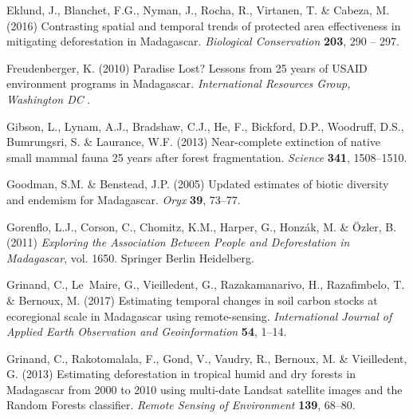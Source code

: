 \documentclass[a4paper, 12pt, leqno]{article} %
\begin{document}
\begin{thebibliography}{60}
Eklund, J., Blanchet, F.G., Nyman, J., Rocha, R., Virtanen, T. \& Cabeza, M.
  (2016) {Contrasting spatial and temporal trends of protected area
  effectiveness in mitigating deforestation in Madagascar}. \emph{Biological
  Conservation} \textbf{203}, 290 -- 297.

Freudenberger, K. (2010) {Paradise Lost? Lessons from 25 years of USAID
  environment programs in Madagascar}. \emph{International Resources Group,
  Washington DC} .

Gibson, L., Lynam, A.J., Bradshaw, C.J., He, F., Bickford, D.P., Woodruff,
  D.S., Bumrungsri, S. \& Laurance, W.F. (2013) Near-complete extinction of
  native small mammal fauna 25 years after forest fragmentation. \emph{Science}
  \textbf{341}, 1508--1510.

Goodman, S.M. \& Benstead, J.P. (2005) {Updated estimates of biotic diversity
  and endemism for Madagascar}. \emph{Oryx} \textbf{39}, 73--77.

Gorenflo, L.J., Corson, C., Chomitz, K.M., Harper, G., Honzák, M. \&
  {\"O}zler, B. (2011) \emph{{Exploring the Association Between People and
  Deforestation in Madagascar}}, vol. 1650. Springer Berlin Heidelberg.

Grinand, C., Le~Maire, G., Vieilledent, G., Razakamanarivo, H., Razafimbelo, T.
  \& Bernoux, M. (2017) {Estimating temporal changes in soil carbon stocks at
  ecoregional scale in Madagascar using remote-sensing}. \emph{International
  Journal of Applied Earth Observation and Geoinformation} \textbf{54}, 1--14.

Grinand, C., Rakotomalala, F., Gond, V., Vaudry, R., Bernoux, M. \&
  Vieilledent, G. (2013) {Estimating deforestation in tropical humid and dry
  forests in Madagascar from 2000 to 2010 using multi-date Landsat satellite
  images and the Random Forests classifier}. \emph{Remote Sensing of
  Environment} \textbf{139}, 68--80.


\end{thebibliography}
\end{document}

